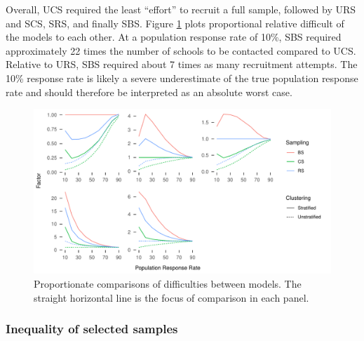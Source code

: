 \documentclass[man,floatsintext]{apa6}
\begin{document}
Overall, UCS required the least \enquote{effort} to recruit a full sample, followed by URS and SCS, SRS, and finally SBS. Figure \ref{fig:fig-comp} plots proportional relative difficult of the models to each other. At a population response rate of 10\%, SBS required approximately 22 times the number of schools to be contacted compared to UCS. Relative to URS, SBS required about 7 times as many recruitment attempts. The 10\% response rate is likely a severe underestimate of the true population response rate and should therefore be interpreted as an absolute worst case.

\begin{figure}
\centering
\includegraphics{GenSamp-Paper_files/figure-latex/fig-comp-1.pdf}
\caption{\label{fig:fig-comp}Proportionate comparisons of difficulties between models. The straight horizontal line is the focus of comparison in each panel.}
\end{figure}

\hypertarget{inequality-of-selected-samples}{%
\subsubsection{Inequality of selected samples}\label{inequality-of-selected-samples}}
\end{document}
